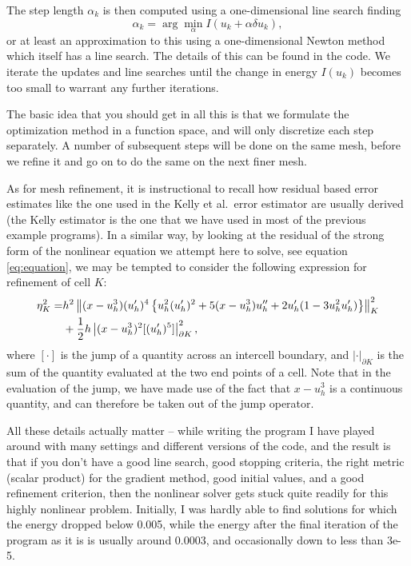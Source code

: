 \documentclass{article}
\begin{document}
The step length $\alpha_k$ is then computed using a one-dimensional line search
finding
\begin{equation}
  \label{eq:linesearch}
  \alpha_k = \arg\min_\alpha I(u_k+\alpha\delta u_k),
\end{equation}
or at least an approximation to this using a one-dimensional Newton method
which itself has a line search. The details of this can be found in the code.
We iterate the updates and line searches until the change in energy $I(u_k)$
becomes too small to warrant any further iterations.

The basic idea that you should get in all this is that we formulate the
optimization method in a function space, and will only discretize each step
separately. A number of subsequent steps will be done on the same mesh, before
we refine it and go on to do the same on the next finer mesh.

As for mesh refinement, it is instructional to recall how residual based error
estimates like the one used in the Kelly et al.~error estimator are usually
derived (the Kelly estimator is the one that we have used in most of the
previous example programs). In a similar way, by looking at the residual of
the strong form of the nonlinear equation we attempt here to solve, see
equation \eqref{eq:equation}, we may be tempted to consider the following
expression for refinement of cell $K$:
\begin{eqnarray}
  \label{eq:error-estimate}
  \eta_K^2 =&
  h^2 \left\|
    (x-u_h^3) (u_h')^4 \left\{ u_h^2 (u_h')^2 + 5(x-u_h^3)u_h'' + 2u_h'(1-3u_h^2u_h') \right\}
  \right\|^2_K
  \notag \\
  & +
  \frac 12 h \left| (x-u_h^3)^2 [(u_h')^5] \right|^2_{\partial K},
\end{eqnarray}
where $[\cdot]$ is the jump of a quantity across an intercell boundary, and 
$|\cdot|_{\partial K}$ is the sum of the quantity evaluated at the two end
points of a cell. Note that in the evaluation of the jump, we have made use of
the fact that $x-u_h^3$ is a continuous quantity, and can therefore be taken
out of the jump operator.

All these details actually matter -- while writing the program I have played
around with many settings and different versions of the code, and the result
is that if you don't have a good line search, good stopping criteria, the
right metric (scalar product) for the gradient method, good initial values,
and a good refinement criterion, then the nonlinear solver gets stuck quite
readily for this highly nonlinear problem. Initially, I was hardly able to
find solutions for which the energy dropped below 0.005, while the energy
after the final iteration of the program as it is is usually around 0.0003,
and occasionally down to less than 3e-5.
\end{document}
